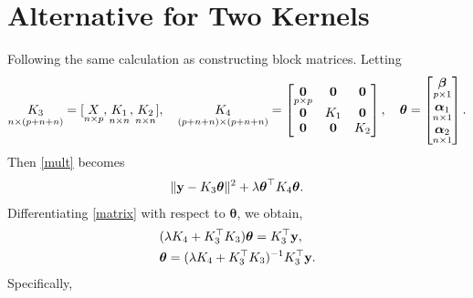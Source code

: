 \documentclass[11pt]{report}
\def\by{{\bf y}}
\def\bzero{{\bf 0}}
\def\bbeta{{\boldsymbol \beta}}
\def\balpha{{\boldsymbol \alpha}}
\def\btheta{{\boldsymbol \theta}}
\begin{document}
\section{Alternative for Two Kernels}
Following the same calculation as constructing block matrices. Letting
\begin{align*}
\underset{n\times (p+n+n)}{K_3}=[\underset{n\times p}{X}, \underset{n\times n}{K_1}, \underset{n\times n}{K_2}], \quad
\underset{(p+n+n) \times (p+n+n)}{K_4}=\begin{bmatrix}
\underset{p\times p}{\bzero} & \bzero &\bzero \\ 
\bzero & K_1 & \bzero\\ 
\bzero & \bzero & K_2
\end{bmatrix}, \quad
\btheta=\begin{bmatrix}
\underset{p\times 1}{\bbeta} \\ 
\underset{n\times 1}{\balpha_1} \\ 
\underset{n\times 1}{\balpha_2}
\end{bmatrix}.
\end{align*}
Then \eqref{mult} becomes
\begin{align}
\lVert \by-K_3 \btheta \rVert^2 + \lambda \btheta^\top K_4 \btheta. \label{matrix}
\end{align}
Differentiating \eqref{matrix} with respect to $\btheta$, we obtain, 
\begin{align*}
&(\lambda K_4+K_3^\top K_3)\btheta = K_3^\top \by,\\
&\btheta = (\lambda K_4+K_3^\top K_3)^{-1}K_3^\top \by.
\end{align*}
Specifically,
\end{document}
